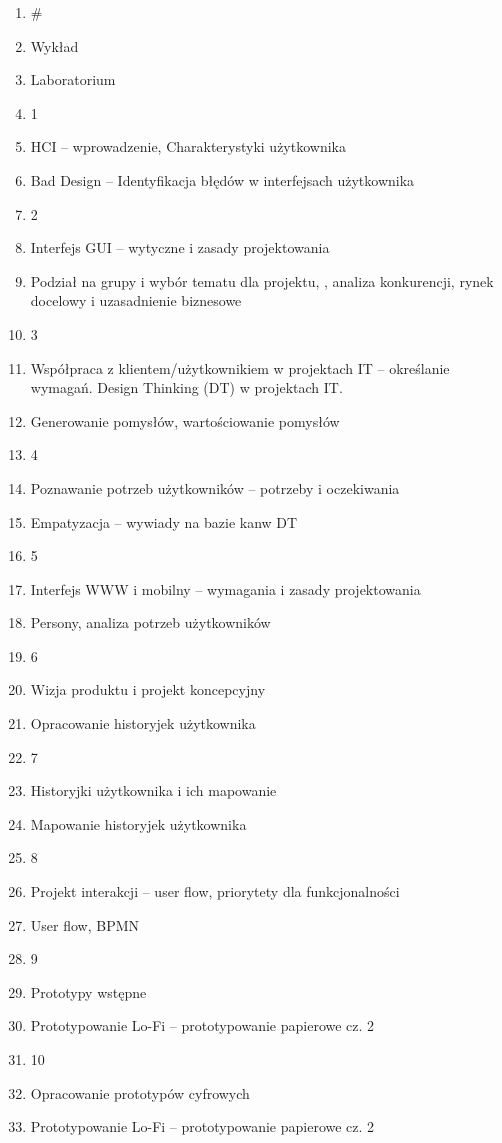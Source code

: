\documentclass[12pt, a4paper]{article}
\begin{document}
\begin{enumerate}
  \item \#
  \item Wykład
  \item Laboratorium
  \item 1
  \item HCI – wprowadzenie, Charakterystyki użytkownika
  \item Bad Design – Identyfikacja błędów w interfejsach użytkownika
  \item 2
  \item Interfejs GUI – wytyczne i zasady projektowania
  \item Podział na grupy i wybór tematu dla projektu,  , analiza konkurencji, rynek docelowy i uzasadnienie biznesowe
  \item 3
  \item Współpraca z klientem/użytkownikiem  w projektach IT – określanie wymagań. Design Thinking (DT) w projektach IT.
  \item Generowanie pomysłów, wartościowanie pomysłów
  \item 4
  \item Poznawanie potrzeb użytkowników – potrzeby i oczekiwania
  \item Empatyzacja – wywiady na bazie kanw DT
  \item 5
  \item Interfejs WWW i mobilny – wymagania i zasady projektowania
  \item Persony, analiza potrzeb użytkowników
  \item 6
  \item Wizja produktu i projekt koncepcyjny
  \item Opracowanie historyjek użytkownika
  \item 7
  \item Historyjki użytkownika i ich mapowanie
  \item Mapowanie historyjek użytkownika
  \item 8
  \item Projekt interakcji – user flow, priorytety dla funkcjonalności
  \item User flow, BPMN
  \item 9
  \item Prototypy wstępne
  \item Prototypowanie Lo-Fi – prototypowanie papierowe cz. 2
  \item 10
  \item Opracowanie prototypów cyfrowych
  \item Prototypowanie Lo-Fi – prototypowanie papierowe cz. 2

\end{enumerate}
\end{document}
